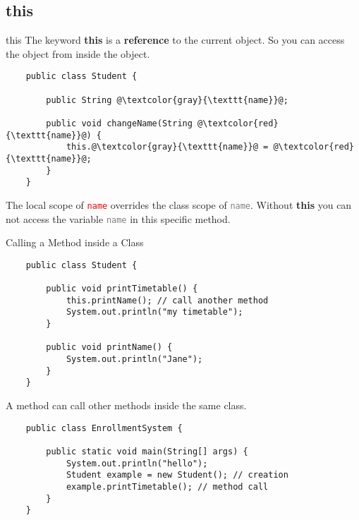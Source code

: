 \subsection{this}
\begin{frame}[fragile]{this}
	The keyword \textbf{this} is a \textbf{reference} to the current object. 
	So you can access the object from inside the object.
	\begin{lstlisting}
	public class Student {
	
	    public String @\textcolor{gray}{\texttt{name}}@;
	    
	    public void changeName(String @\textcolor{red}{\texttt{name}}@) {
	        this.@\textcolor{gray}{\texttt{name}}@ = @\textcolor{red}{\texttt{name}}@;   
	    }
	}
	\end{lstlisting}
	The local scope of \textcolor{red}{\texttt{name}} overrides the class scope of \textcolor{gray}{\texttt{name}}. 
	Without \textbf{this} you can not access the variable \textcolor{gray}{\texttt{name}} in this specific method.
\end{frame}

\begin{frame}{Calling a Method inside a Class}
	\begin{lstlisting}
	public class Student {
	
	    public void printTimetable() {
	        this.printName(); // call another method
	        System.out.println("my timetable");
	    }
	    
	    public void printName() {
	        System.out.println("Jane");
	    }
	}
	\end{lstlisting}
	A method can call other methods inside the same class.
	\begin{lstlisting}
	public class EnrollmentSystem {
	    
	    public static void main(String[] args) {
	        System.out.println("hello");
	        Student example = new Student(); // creation
	        example.printTimetable(); // method call
	    }
	}
	\end{lstlisting}
\end{frame}

